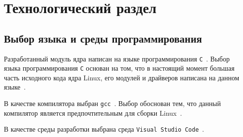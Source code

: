 \chapter{Технологический раздел}

\section{Выбор языка и среды программирования}

Разработанный модуль ядра написан на языке программирования \texttt{C}~\cite{c-language}. Выбор языка программирования \texttt{С} основан на том, что в настоящий момент большая часть исходного кода ядра Linux, его модулей и драйверов написана на данном языке~\cite{rust-in-linux}.

В качестве компилятора выбран \texttt{gcc}~\cite{gcc}. Выбор обоснован тем, что данный компилятор является предпочтительным для сборки Linux~\cite{build-linux}.

В качестве среды разработки выбрана среда \texttt{Visual Studio Code}~\cite{vscode}.
